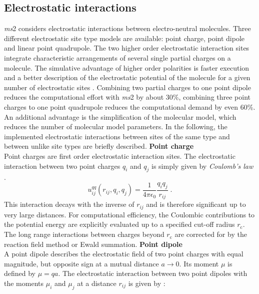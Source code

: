 \subsection{Electrostatic interactions}
\label{sec:Electrostatic Interaction}


\textit{ms}2 considers electrostatic interactions between electro-neutral molecules. Three different electrostatic site type models are available: point charge, point dipole and linear point quadrupole. The two higher order electrostatic interaction sites integrate characteristic arrangements of several single partial charges on a molecule. The simulative advantage of higher order polarities is faster execution and a better description of the electrostatic potential of the molecule for a given number of electrostatic sites \parencite{stone}. Combining two partial charges to one point dipole reduces the computational effort with \textit{ms}2 by about 30\%, combining three point charges to one point quadrupole reduces the computational demand by even 60\%. An additional advantage is the simplification of the molecular model, which reduces the number of molecular model parameters. In the following, the implemented electrostatic interactions between sites of the same type and between unlike site types are briefly described.
\newline \newline
\textbf{Point charge}\\
Point charges are first order electrostatic interaction sites. The electrostatic interaction between two point charges $q_{i}$ and $q_{j}$ is simply given by \textit{Coulomb's law} \parencite{Rappaport,Frenkel}.
\begin{equation}
u^{qq}_{ij}\left(r_{ij}, q_{i}, q_{j}\right)=\frac{1}{4 \pi \epsilon_{0}}\frac{q_{i}q_{j}}{r_{ij}} \;.
\label{eq:PointCharge}
\end{equation}
This interaction decays with the inverse of $r_{ij}$ and is therefore significant up to very large distances. For computational efficiency, the Coulombic contributions to the potential energy are explicitly evaluated up to a specified cut-off radius $r_{\text{c}}$. The long range interactions between charges beyond $r_{\text{c}}$ are corrected for by the reaction field method or Ewald summation. %
\newline \newline
\textbf{Point dipole}\\
A point dipole describes the electrostatic field of two point charges with equal magnitude, but opposite sign at a mutual distance $a \rightarrow 0$. Its moment $\mu$ is defined by $\mu=qa$. The electrostatic interaction between two point dipoles with the moments $\mu_{i}$ and $\mu_{j}$ at a distance $r_{ij}$ is given by \parencite{Allen, gray}:
